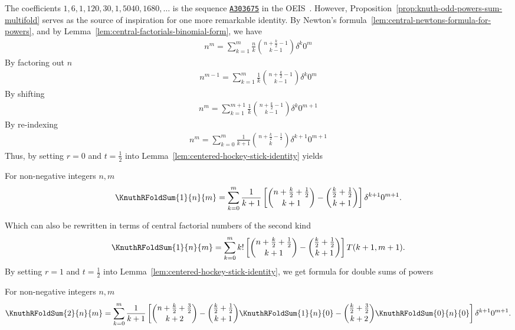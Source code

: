 The coefficients $1, 6, 1, 120, 30, 1, 5040, 1680,\ldots$
is the sequence \href{https://oeis.org/A303675}{\texttt{A303675}}
in the OEIS~\cite{sloane2003line}.
However, Proposition~\eqref{prop:knuth-odd-powers-sum-multifold} serves
as the source of inspiration for one more remarkable identity.
By Newton's formula~\eqref{lem:central-newtons-formula-for-powers},
and by Lemma~\eqref{lem:central-factorials-binomial-form}, we have
\begin{align*}
  n^m = \sum_{k=1}^{m} \frac{n}{k} \binom{n+\frac{k}{2}-1}{k-1} \delta^{k} 0^m
\end{align*}
By factoring out $n$
\begin{align*}
  n^{m-1} = \sum_{k=1}^{m} \frac{1}{k} \binom{n+\frac{k}{2}-1}{k-1} \delta^{k} 0^m
\end{align*}
By shifting
\begin{align*}
  n^{m} = \sum_{k=1}^{m+1} \frac{1}{k} \binom{n+\frac{k}{2}-1}{k-1} \delta^{k} 0^{m+1}
\end{align*}
By re-indexing
\begin{align}
  \label{eq:power-identity-at-zero}
  n^{m} = \sum_{k=0}^{m} \frac{1}{k+1} \binom{n+\frac{k}{2}-\frac{1}{2}}{k} \delta^{k+1} 0^{m+1}
\end{align}
Thus, by setting $r=0$ and $t=\frac{1}{2}$
into Lemma~\eqref{lem:centered-hockey-stick-identity} yields
\begin{proposition}
  \label{prop:ordinary-sums-of-powers-at-zero}
  For non-negative integers $n,m$
  \begin{align*}
    \KnuthRFoldSum{1}{n}{m}
    = \sum_{k=0}^{m} \frac{1}{k+1}
    \left[ \binom{n+\frac{k}{2}+\frac{1}{2}}{k+1} - \binom{\frac{k}{2}+\frac{1}{2}}{k+1}\right]
    \delta^{k+1} 0^{m+1}.
  \end{align*}
\end{proposition}
Which can also be rewritten in terms of central factorial numbers
of the second kind
\begin{align*}
  \KnuthRFoldSum{1}{n}{m}
  = \sum_{k=0}^{m} k!
  \left[ \binom{n+\frac{k}{2}+\frac{1}{2}}{k+1} - \binom{\frac{k}{2}+\frac{1}{2}}{k+1}\right]
  T(k+1, m+1).
\end{align*}
By setting $r=1$ and $t=\frac{1}{2}$
into Lemma~\eqref{lem:centered-hockey-stick-identity},
we get formula for double sums of powers
\begin{proposition}
  \label{prop:double-sums-of-powers-at-zero}
  For non-negative integers $n,m$
  \begin{align*}
    \KnuthRFoldSum{2}{n}{m}
    = \sum_{k=0}^{m} \frac{1}{k+1}
    \left[
      \binom{n+\frac{k}{2}+\frac{3}{2}}{k+2}
      - \binom{\frac{k}{2}+\frac{1}{2}}{k+1} \KnuthRFoldSum{1}{n}{0}
      - \binom{\frac{k}{2}+\frac{3}{2}}{k+2} \KnuthRFoldSum{0}{n}{0}
    \right]
    \delta^{k+1} 0^{m+1}.
  \end{align*}
\end{proposition}
